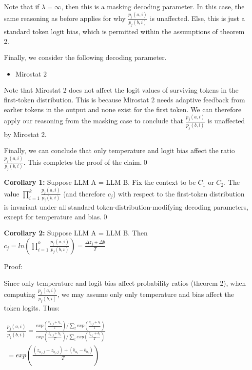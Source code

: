 \documentclass{article}
\begin{document}
Note that if $\displaystyle \lambda =\infty $, then this is a masking decoding parameter. In this case, the same reasoning as before applies for why $\displaystyle \frac{p_{j}\left( a,i\right)}{p_{j}\left( b,i\right)}$ is unaffected. Else, this is just a standard token logit bias, which is permitted within the assumptions of theorem 2.



Finally, we consider the following decoding parameter.
\begin{itemize}
\item Mirostat 2
\end{itemize}

Note that Mirostat 2 does not affect the logit values of surviving tokens in the first-token distribution. This is because Mirostat 2 needs adaptive feedback from earlier tokens in the output and none exist for the first token. We can therefore apply our reasoning from the masking case to conclude that $\displaystyle \frac{p_{j}\left( a,i\right)}{p_{j}\left( b,i\right)}$ is unaffected by Mirostat 2.



Finally, we can conclude that only temperature and logit bias affect the ratio $\displaystyle \frac{p_{j}\left( a,i\right)}{p_{j}\left( b,i\right)}$. This completes the proof of the claim.\qed 



\textbf{Corollary 1:} Suppose LLM A = LLM B. Fix the context to be $\displaystyle C_{1}$ or $\displaystyle C_{2}$. The value $\displaystyle \prod _{i=1}^{k}\frac{p_{j}\left( a,i\right)}{p_{j}\left( b,i\right)}$ (and therefore $\displaystyle c_{j}$) with respect to the first-token distribution is invariant under all standard token-distribution-modifying decoding parameters, except for temperature and bias.\qed 



\textbf{Corollary 2:} Suppose LLM A = LLM B. Then $\displaystyle c_{j} =ln\left(\prod _{i=1}^{k}\frac{p_{j}\left( a,i\right)}{p_{j}\left( b,i\right)}\right) =\frac{\Delta z_{j} +\Delta b}{T}$

Proof:

Since only temperature and logit bias affect probability ratios (theorem 2), when computing $\displaystyle \frac{p_{j}\left( a,i\right)}{p_{j}\left( b,i\right)}$, we may assume only only temperature and bias affect the token logits. Thus:

$\displaystyle \begin{array}{l}
\frac{p_{j}\left( a,i\right)}{p_{j}\left( b,i\right)} =\frac{exp\left(\frac{z_{a_{i} ,j} +b_{a_{i}}}{T}\right) /\sum _{t} exp\left(\frac{z_{t,j} +b_{t}}{T}\right)}{exp\left(\frac{z_{b_{i} ,j} +b_{b_{i}}}{T}\right) /\sum _{t} exp\left(\frac{z_{t,j} +b_{t}}{T}\right)}\\
=exp\left(\frac{\left( z_{a_{i} ,j} -z_{b_{i} ,j}\right) +\left( b_{a_{i}} -b_{b_{i}}\right)}{T}\right)
\end{array}$
\end{document}

